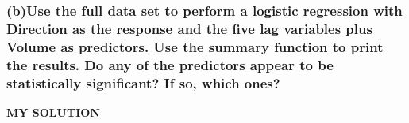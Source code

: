 \documentclass[
]{article}
\begin{document}
\hypertarget{buse-the-full-data-set-to-perform-a-logistic-regression-with-direction-as-the-response-and-the-five-lag-variables-plus-volume-as-predictors.-use-the-summary-function-to-print-the-results.-do-any-of-the-predictors-appear-to-be-statistically-significant-if-so-which-ones}{%
\subsubsection{\texorpdfstring{\textbf{(b)Use the full data set to
perform a logistic regression with Direction as the response and the
five lag variables plus Volume as predictors. Use the summary function
to print the results. Do any of the predictors appear to be
statistically significant? If so, which
ones?}}{(b)Use the full data set to perform a logistic regression with Direction as the response and the five lag variables plus Volume as predictors. Use the summary function to print the results. Do any of the predictors appear to be statistically significant? If so, which ones?}}\label{buse-the-full-data-set-to-perform-a-logistic-regression-with-direction-as-the-response-and-the-five-lag-variables-plus-volume-as-predictors.-use-the-summary-function-to-print-the-results.-do-any-of-the-predictors-appear-to-be-statistically-significant-if-so-which-ones}}

\textbf{MY SOLUTION}
\end{document}
